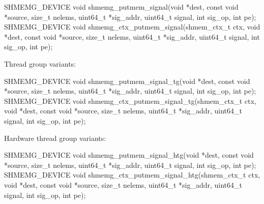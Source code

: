 \begin{apidefinition}
\begin{Csynopsis}
SHMEMG_DEVICE void shmemg_putmem_signal(void *dest, const void *source,
    size_t nelems, uint64_t *sig_addr, uint64_t signal,
    int sig_op, int pe);
SHMEMG_DEVICE void shmemg_ctx_putmem_signal(shmem_ctx_t ctx, void *dest,
    const void *source, size_t nelems, uint64_t *sig_addr,
    uint64_t signal, int sig_op, int pe);
\end{Csynopsis}

Thread group variants:
\begin{CsynopsisCol}
SHMEMG_DEVICE void shmemg_putmem_signal_tg(void *dest, const void *source,
    size_t nelems, uint64_t *sig_addr, uint64_t signal,
    int sig_op, int pe);
SHMEMG_DEVICE void shmemg_ctx_putmem_signal_tg(shmem_ctx_t ctx, void *dest,
    const void *source, size_t nelems, uint64_t *sig_addr,
    uint64_t signal, int sig_op, int pe);
\end{CsynopsisCol}

Hardware thread group variants:
\begin{CsynopsisCol}
SHMEMG_DEVICE void shmemg_putmem_signal_htg(void *dest, const void *source,
    size_t nelems, uint64_t *sig_addr, uint64_t signal,
    int sig_op, int pe);
SHMEMG_DEVICE void shmemg_ctx_putmem_signal_htg(shmem_ctx_t ctx, void *dest,
    const void *source, size_t nelems, uint64_t *sig_addr,
    uint64_t signal, int sig_op, int pe);
\end{CsynopsisCol}

\begin{apiarguments}
\end{apiarguments}

\end{apidefinition}
